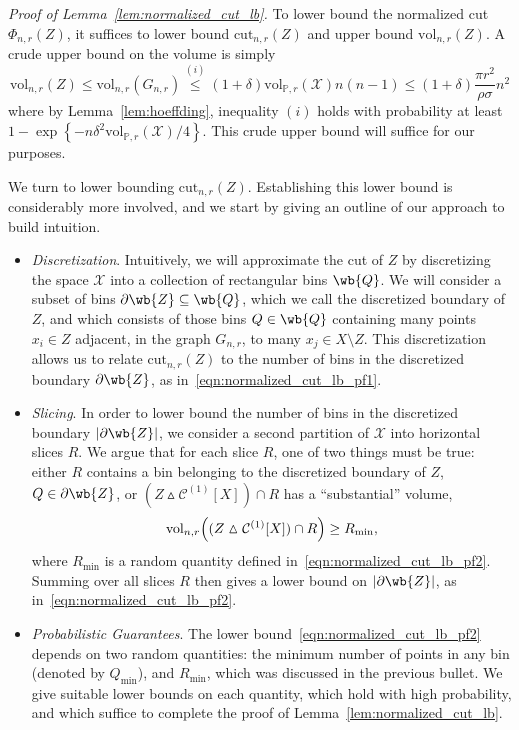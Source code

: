 \documentclass[twoside,11pt]{article}
\newcommand{\set}[1]{\left\{#1\right\}}
\newcommand{\1}{\mathbf{1}}
\newcommand{\mc}[1]{\mathcal{#1}}
\newcommand{\Pbb}{\mathbb{P}}
\newcommand{\vol}{\mathrm{vol}}
\newcommand{\cut}{\mathrm{cut}}
\begin{document}
\noindent \emph{Proof of Lemma~\ref{lem:normalized_cut_lb}.}
To lower bound the normalized cut $\Phi_{n,r}(Z)$, it suffices to lower bound $\cut_{n,r}(Z)$ and upper bound $\vol_{n,r}(Z)$. A crude upper bound on the volume is simply 
\begin{equation}
\label{eqn:normalized_cut_lb_pf4}
\vol_{n,r}(Z) \leq \vol_{n,r}(G_{n,r}) \overset{(i)}{\leq} (1 + \delta)  \vol_{\Pbb,r}(\mathcal{X}) n (n - 1) \leq (1 + \delta)\frac{\pi r^2}{\rho \sigma} n^2
\end{equation}
where by Lemma~\ref{lem:hoeffding}, inequality $(i)$ holds with probability at least $1 - \exp\set{-n\delta^2 \vol_{\Pbb,r}(\mathcal{X})/4}$. This crude upper bound will suffice for our purposes.

We turn to lower bounding $\cut_{n,r}(Z)$. Establishing this lower bound is considerably more involved, and we start by giving an outline of our approach to build intuition.
\begin{itemize}
	\item \emph{Discretization}. Intuitively, we will approximate the cut of $Z$ by discretizing the space $\mathcal{X}$ into a collection of rectangular bins $\wb{Q}$. We will consider a subset of bins $\partial \wb{Z} \subseteq \wb{Q}$, which we call the discretized boundary of $Z$, and which consists of those bins $Q \in \wb{Q}$ containing many points $x_i \in Z$ adjacent, in the graph $G_{n,r}$, to many $x_j \in X \setminus Z$. This discretization allows us to relate $\cut_{n,r}(Z)$ to the number of bins in the discretized boundary $\partial \wb{Z}$, as in~\eqref{eqn:normalized_cut_lb_pf1}.
	\item \emph{Slicing}. In order to lower bound the number of bins in the discretized boundary $|\partial \wb{Z}|$, we consider a second partition of $\mc{X}$ into horizontal slices $R$. We argue that for each slice $R$, one of two things must be true: either $R$ contains a bin belonging to the discretized boundary of $Z$, $Q \in \partial \wb{Z}$, or $(Z \vartriangle \mc{C}^{(1)}[X]) \cap R$ has a ``substantial'' volume,
	\begin{equation*}
	\vol_{n,r}\Bigl((Z \vartriangle \mc{C}^{(1)}[X]) \cap R\Bigr) \geq R_{\min},
	\end{equation*}
	where $R_{\min}$ is a random quantity defined in~\eqref{eqn:normalized_cut_lb_pf2}.
	Summing over all slices $R$ then gives a lower bound on $|\partial \wb{Z}|$, as in~\eqref{eqn:normalized_cut_lb_pf2}. 
	\item \emph{Probabilistic Guarantees}. The lower bound~\eqref{eqn:normalized_cut_lb_pf2} depends on two random quantities: the minimum number of points in any bin (denoted by $Q_{\min}$), and $R_{\min}$, which was discussed in the previous bullet. We give suitable lower bounds on each quantity, which hold with high probability, and which suffice to complete the proof of Lemma~\ref{lem:normalized_cut_lb}.
\end{itemize}
\end{document}
